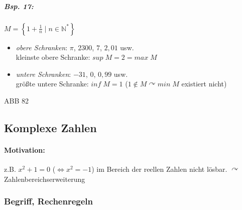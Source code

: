 \subparagraph{Bsp. 17:} \parskp
$M=\left\lbrace 1+\frac{1}{n}\;|\;n\in \mathbb{N}^*\right\rbrace$
\begin{itemize}
\item \emph{obere Schranken}: $\pi$, $2300$, $7$, $2,01$ usw.\\
kleinste obere Schranke: $sup \; M = 2= max \; M$
\item \emph{untere Schranken}: $-31$, $0$, $0,99$ usw.\\
größte untere Schranke: $inf\; M =1$ ($1 \not \in M \curvearrowright min \; M$ existiert nicht)
\end{itemize}
ABB 82

\subsection{Komplexe Zahlen}

\paragraph{Motivation:} z.B. $\boxed{x^2+1=0}$ ($\Leftrightarrow x^2=-1$) im Bereich der reellen Zahlen nicht lösbar.
$\curvearrowright$ Zahlenbereichserweiterung

\subsubsection{Begriff, Rechenregeln}

